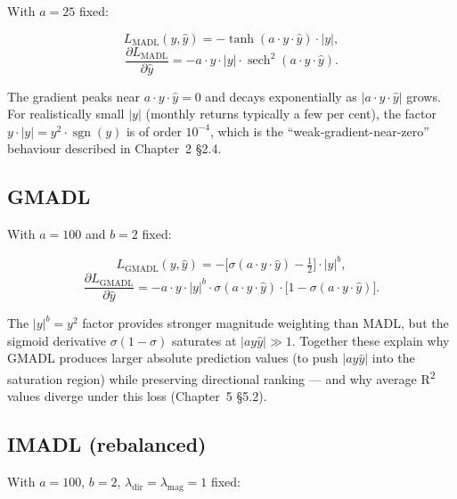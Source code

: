 With $a = 25$ fixed:

\begin{equation}
L_{\mathrm{MADL}}(y, \hat y) = -\tanh(a \cdot y \cdot \hat y) \cdot |y|,
\end{equation}
\begin{equation}
\frac{\partial L_{\mathrm{MADL}}}{\partial \hat y} = -a \cdot y \cdot |y| \cdot \operatorname{sech}^2(a \cdot y \cdot \hat y).
\end{equation}

The gradient peaks near $a \cdot y \cdot \hat y = 0$ and decays exponentially as $|a \cdot y \cdot \hat y|$ grows. For realistically small $|y|$ (monthly returns typically a few per cent), the factor $y \cdot |y| = y^2 \cdot \operatorname{sgn}(y)$ is of order $10^{-4}$, which is the ``weak-gradient-near-zero'' behaviour described in Chapter~2 \S2.4.

\subsection{GMADL}

\label{subsec:gmadl}

With $a = 100$ and $b = 2$ fixed:

\begin{equation}
L_{\mathrm{GMADL}}(y, \hat y) = -\big[\sigma(a \cdot y \cdot \hat y) - \tfrac12\big] \cdot |y|^b,
\end{equation}
\begin{equation}
\frac{\partial L_{\mathrm{GMADL}}}{\partial \hat y}
= -a \cdot y \cdot |y|^b \cdot \sigma(a \cdot y \cdot \hat y) \cdot \big[1 - \sigma(a \cdot y \cdot \hat y)\big].
\end{equation}

The $|y|^b = y^2$ factor provides stronger magnitude weighting than MADL, but the sigmoid derivative $\sigma(1-\sigma)$ saturates at $|a y \hat y| \gg 1$. Together these explain why GMADL produces larger absolute prediction values (to push $|a y \hat y|$ into the saturation region) while preserving directional ranking --- and why average R\textsuperscript{2} values diverge under this loss (Chapter~5 \S5.2).

\subsection{IMADL (rebalanced)}

\label{subsec:imadl}

With $a = 100$, $b = 2$, $\lambda_{\mathrm{dir}} = \lambda_{\mathrm{mag}} = 1$ fixed:


